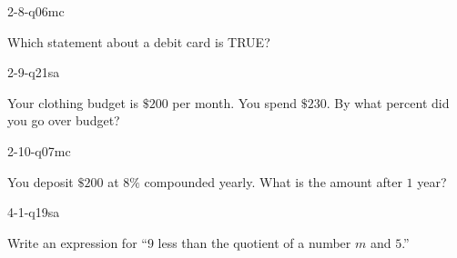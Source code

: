\begin{practiceQuestion}{2-8-q06}{mc}
\begin{questionText}
Which statement about a debit card is TRUE?
\end{questionText}
\end{practiceQuestion}

\begin{practiceQuestion}{2-9-q21}{sa}
\begin{questionText}
Your clothing budget is $\$200$ per month. You spend $\$230$. By what percent did you go over budget?
\end{questionText}
\end{practiceQuestion}

\begin{practiceQuestion}{2-10-q07}{mc}
\begin{questionText}
You deposit $\$200$ at $8\%$ compounded yearly. What is the amount after $1$ year?
\end{questionText}
\end{practiceQuestion}

\begin{practiceQuestion}{4-1-q19}{sa}
\begin{questionText}
Write an expression for ``$9$ less than the quotient of a number $m$ and $5$.''
\end{questionText}
\end{practiceQuestion}

